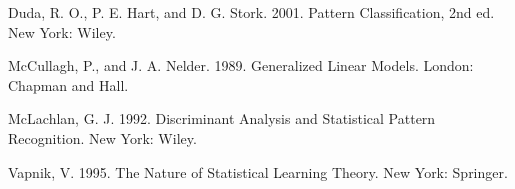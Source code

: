 Duda, R. O., P. E. Hart, and D. G. Stork. 2001. Pattern Classification, 2nd ed. New York: Wiley.

McCullagh, P., and J. A. Nelder. 1989. Generalized Linear Models. London: Chapman and Hall.

McLachlan, G. J. 1992. Discriminant Analysis and Statistical Pattern Recognition. New York: Wiley.

Vapnik, V. 1995. The Nature of Statistical Learning Theory. New York: Springer.
